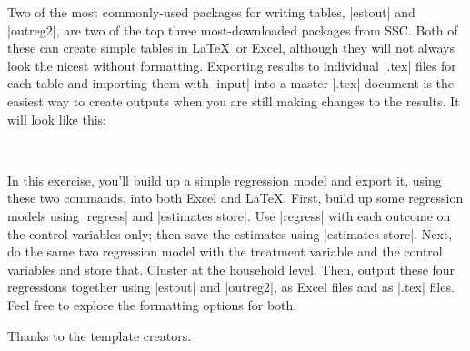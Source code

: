 \documentclass{tufte-handout}
\begin{document}
Two of the most commonly-used packages for writing tables, |estout| and |outreg2|,
are two of the top three most-downloaded packages from SSC.
Both of these can create simple tables in \LaTeX\ or Excel,
although they will not always look the nicest without formatting.
Exporting results to individual |.tex| files for each table and
importing them with |input| into a master |.tex| document
is the easiest way to create outputs when you are still making changes to the results. It will look like this:
\begin{Verbatim}
  
\end{Verbatim}

\bigskip
\noindent
\bigskip

In this exercise, you’ll build up a simple regression model and export it,
using these two commands, into both Excel and \LaTeX.
First, build up some regression models using |regress| and |estimates store|.
Use |regress| with each outcome on the control variables only;
then save the estimates using |estimates store|.
Next, do the same two regression model with the treatment variable and
the control variables and store that. Cluster at the household level.
Then, output these four regressions together using |estout| and |outreg2|,
as Excel files and as |.tex| files.
Feel free to explore the formatting options for both.

Thanks to the template creators.\cite{tuftelatex}




\newpage

\begin{figure}[h]
{
}
\end{figure}

\begin{figure}[h]
{
}
\end{figure}

\begin{figure}[h]
{
}
\end{figure}
\end{document}
